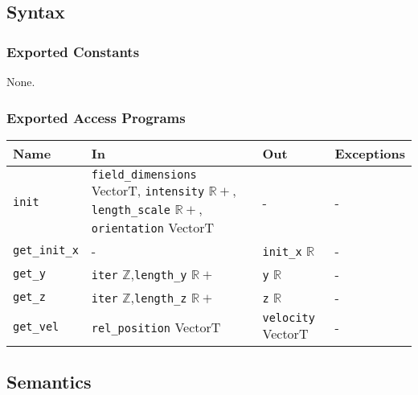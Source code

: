 \documentclass[12pt, titlepage]{article}
\begin{document}
\subsection{Syntax}

\subsubsection{Exported Constants}
None.

\subsubsection{Exported Access Programs}

\begin{center}
\begin{tabular}{p{2cm} p{5.6cm} p{3cm} p{3cm}}
\hline
\textbf{Name} & \textbf{In} & \textbf{Out} & \textbf{Exceptions} \\
\hline
\texttt{init} & \texttt{field\_dimensions} VectorT, \newline\texttt{intensity} $\mathbb{R+}$, \newline\texttt{length\_scale} $\mathbb{R+}$, \newline\texttt{orientation} VectorT & - & - \\
\texttt{get\_init\_x}& - & \texttt{init\_x} $\mathbb{R}$ & - \\
\texttt{get\_y}& \texttt{iter} $\mathbb{Z}$,\newline\texttt{length\_y} $\mathbb{R+}$ & \texttt{y} $\mathbb{R}$ & - \\
\texttt{get\_z}& \texttt{iter} $\mathbb{Z}$,\newline\texttt{length\_z} $\mathbb{R+}$ & \texttt{z} $\mathbb{R}$ & - \\
\texttt{get\_vel}& \texttt{rel\_position} VectorT & \texttt{velocity} VectorT & - \\
\hline
\end{tabular}
\end{center}

\subsection{Semantics}
\end{document}
